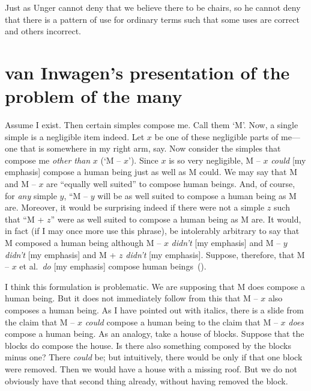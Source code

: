 \documentclass[11pt]{article}
\newenvironment{squote}{%
       \begin{spacing}{1}
       \begin{list}{}{%
       \setlength{\labelwidth}{0pt}%
       \rightmargin\leftmargin%
       }
       \item\relax
       }{%
       \end{list}%
       \end{spacing}
}
\begin{document}
\begin{spacing}{1}
Just as Unger cannot deny that we believe there to be chairs, so he
cannot deny that there is a pattern of use for ordinary terms such
that some uses are correct and others incorrect.

\section{van Inwagen's presentation of the problem of the many}
\begin{squote}
Assume I exist.  Then certain simples compose me.  Call them `M'.
Now, a single simple is a negligible item indeed.  Let $x$ be one of
these negligible parts of me---one that is somewhere in my right arm,
say.  Now consider the simples that compose me {\em other than} $x$
(`M -- $x$').  Since $x$ is so very negligible, M -- $x$ {\em could}
[my emphasis] compose a human being just as well as M could.  We may
say that M and M -- $x$ are ``equally well suited'' to compose human
beings.  And, of course, for {\em any} simple $y$, ``M -- $y$ will be
as well suited to compose a human being as M are.  Moreover, it would
be surprising indeed if there were not a simple $z$ such that ``M +
$z$'' were as well suited to compose a human being as M are.  It
would, in fact (if I may once more use this phrase), be intolerably
arbitrary to say that M composed a human being although M -- $x$ {\em
  didn't} [my emphasis] and M -- $y$ {\em didn't} [my emphasis] and M
+ $z$ {\em didn't} [my emphasis].  Suppose, therefore, that M -- $x$
et al.\ {\em do} [my emphasis] compose human
beings~(\citeyear[215]{inwagen1995}).
\end{squote}

I think this formulation is problematic.  We are supposing that M does
compose a human being.  But it does not immediately follow from this
that M -- $x$ also composes a human being.  As I have pointed out with
italics, there is a slide from the claim that M -- $x$ {\em could}
compose a human being to the claim that M -- $x$ {\em does} compose a
human being.  As an analogy, take a house of blocks.  Suppose that the
blocks do compose the house.  Is there also something composed by the
blocks minus one? There {\em could} be; but intuitively, there would
be only if that one block were removed.  Then we would have a house
with a missing roof.  But we do not obviously have that second thing
already, without having removed the block.


\end{spacing}
\end{document}
